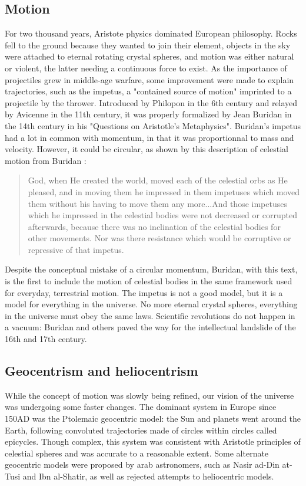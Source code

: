 \subsection*{Motion}
For two thousand years, Aristote physics dominated European philosophy. Rocks fell to the ground because they wanted to join their element, objects in the sky were attached to eternal rotating crystal spheres, and motion was either natural or violent, the latter needing a continuous force to exist. As the importance of projectiles grew in middle-age warfare, some improvement were made to explain trajectories, such as the impetus, a "contained source of motion" imprinted to a projectile by the thrower. Introduced by Philopon in the 6th century and relayed by Avicenne in the 11th century, it was properly formalized by Jean Buridan in the 14th century in his "Questions on Aristotle's Metaphysics". Buridan's impetus had a lot in common with momentum, in that it was proportionnal to mass and velocity. However, it could be circular, as shown by this description of celestial motion from Buridan \citep{Clagett1959}:

\begin{quote}
God, when He created the world, moved each of the celestial orbs as He pleased, and in moving them he impressed in them impetuses which moved them without his having to move them any more...And those impetuses which he impressed in the celestial bodies were not decreased or corrupted afterwards, because there was no inclination of the celestial bodies for other movements. Nor was there resistance which would be corruptive or repressive of that impetus.
\end{quote} 




Despite the conceptual mistake of a circular momentum, Buridan, with this text, is the first to include the motion of celestial bodies in the same framework used for everyday, terrestrial motion. The impetus is not a good model, but it is a model for everything in the universe. No more eternal crystal spheres, everything in the universe must obey the same laws. Scientific revolutions do not happen in a vacuum: Buridan and others paved the way for the intellectual landslide of the 16th and 17th century.

\subsection*{Geocentrism and heliocentrism}

While the concept of motion was slowly being refined, our vision of the universe was undergoing some faster changes. The dominant system in Europe since 150AD was the Ptolemaic geocentric model: the Sun and planets went around the Earth, following convoluted trajectories made of circles within circles called epicycles. Though complex, this system was consistent with Aristotle principles of celestial spheres and was accurate to a reasonable extent. Some alternate geocentric models were proposed by arab astronomers, such as Nasir ad-Din at-Tusi and Ibn al-Shatir, as well as rejected attempts to heliocentric models.

